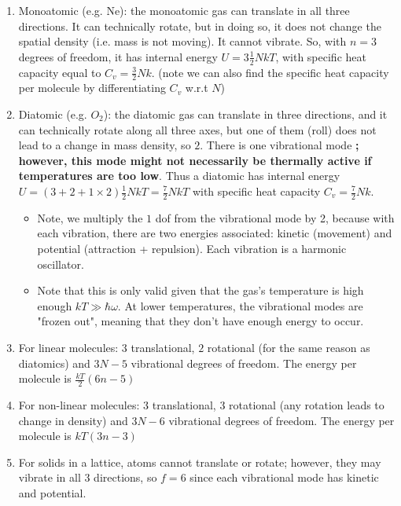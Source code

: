 \documentclass[8pt]{article}
\begin{document}
\begin{enumerate}
    \item Monoatomic (e.g. Ne): the monoatomic gas can translate in all three directions. It can technically rotate, but in doing so, it does not change the spatial density (i.e. mass is not moving). It cannot vibrate. So, with $n =3 $ degrees of freedom, it has internal energy $U = 3 \frac{1}{2}NkT$, with specific heat capacity equal to $C_v = \frac{3}{2}Nk$.  (note we can also find the specific heat capacity per molecule by differentiating $C_v$ w.r.t $N$)
    \item Diatomic (e.g. $O_2$): the diatomic gas can translate in three directions, and it can technically rotate along all three axes, but one of them (roll) does not lead to a change in mass density, so $2$. There is one vibrational mode \textbf{; however, this mode might not necessarily be thermally active if temperatures are too low}. Thus a diatomic has internal energy $U = (3 + 2 + 1 \times 2) \frac{1}{2} NkT = \frac{7}{2} NkT$ with specific heat capacity $C_v = \frac{7}{2}Nk$. 
    \begin{itemize}
        \item Note, we multiply the $1$ dof from the vibrational mode by 2, because with each vibration, there are two energies associated: kinetic (movement) and potential (attraction + repulsion). Each vibration is a harmonic oscillator. 
        \item Note that this is only valid given that the gas's temperature is high enough $kT \gg \hbar \omega$. At lower temperatures, the vibrational modes are "frozen out", meaning that they don't have enough energy to occur. 
    \end{itemize}
    \item For linear molecules: $3$ translational, $2$ rotational (for the same reason as diatomics) and $3N-5$ vibrational degrees of freedom. The energy per molecule is  $\frac{kT}{2}(6n-5)$
    \item For non-linear molecules: $3$ translational, $3$ rotational (any rotation leads to change in density) and $3N-6$ vibrational degrees of freedom. The energy per molecule is $kT(3n-3)$  
    \item For solids in a lattice, atoms cannot translate or rotate; however, they may vibrate in all 3 directions, so $f=6$ since each vibrational mode has kinetic and potential. 

\end{enumerate}
\end{document}
